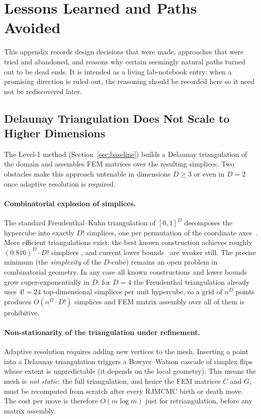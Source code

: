 \documentclass[11pt]{article}
\begin{document}



\appendix

\section{Lessons Learned and Paths Avoided}
\label{sec:lessons}

This appendix records design decisions that were made, approaches that were
tried and abandoned, and reasons why certain seemingly natural paths turned out
to be dead ends.  It is intended as a living lab-notebook entry: when a
promising direction is ruled out, the reasoning should be recorded here so it
need not be rediscovered later.

\subsection{Delaunay Triangulation Does Not Scale to Higher Dimensions}
\label{sec:lesson-delaunay}

The Level-1 method (Section~\ref{sec:baseline}) builds a Delaunay
triangulation of the domain and assembles FEM matrices over the resulting
simplices.  Two obstacles make this approach untenable in dimensions $D \ge 3$
or even in $D=2$ once adaptive resolution is required.

\paragraph{Combinatorial explosion of simplices.}
The standard Freudenthal--Kuhn triangulation of $[0,1]^D$ decomposes the
hypercube into exactly $D!$ simplices, one per permutation of the coordinate
axes~\citep{freudenthal1942}.  More efficient triangulations exist: the best
known construction achieves roughly $(0.816)^D \cdot D!$ simplices
\citep{ordensantos2003}, and current lower bounds~\citep{glazyrin2012} are
weaker still.  The precise minimum (the \emph{simplexity} of the $D$-cube)
remains an open problem in combinatorial geometry.  In any case all known
constructions and lower bounds grow super-exponentially in $D$: for $D=4$ the
Freudenthal triangulation already uses $4! = 24$ top-dimensional simplices per
unit hypercube, so a grid of $n^D$ points produces $O(n^D \cdot D!)$ simplices
and FEM matrix assembly over all of them is prohibitive.

\paragraph{Non-stationarity of the triangulation under refinement.}
Adaptive resolution requires adding new vertices to the mesh.  Inserting a
point into a Delaunay triangulation triggers a Bowyer--Watson cascade of
simplex flips whose extent is unpredictable (it depends on the local geometry).
This means the mesh is \emph{not static}: the full triangulation, and hence the
FEM matrices $C$ and $G$, must be recomputed from scratch after every RJMCMC
birth or death move.  The cost per move is therefore $O(m \log m)$ just for
retriangulation, before any matrix assembly.
\end{document}
